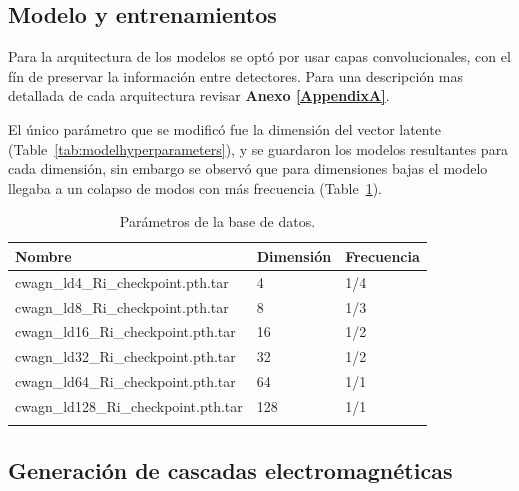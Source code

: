 \subsection*{Modelo y entrenamientos}

Para la arquitectura de los modelos se optó por usar capas convolucionales, con el fín de preservar la información entre detectores. Para una descripción mas detallada de cada arquitectura revisar \textbf{Anexo \ref{AppendixA}}.

El único parámetro que se modificó fue la dimensión del vector latente (Table~\ref{tab:modelhyperparameters}), y se guardaron los modelos resultantes para cada dimensión, sin embargo se observó que para dimensiones bajas el modelo llegaba a un colapso de modos con más frecuencia (Table~\ref{tab:latentDimTrains}).

\begin{table}
    \caption{Parámetros de la base de datos.}
    \label{tab:latentDimTrains}
    \centering
    \begin{tabular}{l l l}
        \toprule
        \textbf{Nombre} & \textbf{Dimensión} & \textbf{Frecuencia} \\
        \midrule
        cwagn\_ld4\_Ri\_checkpoint.pth.tar     & 4    & 1/4\\
        cwagn\_ld8\_Ri\_checkpoint.pth.tar     & 8    & 1/3\\
        cwagn\_ld16\_Ri\_checkpoint.pth.tar    & 16   & 1/2\\
        cwagn\_ld32\_Ri\_checkpoint.pth.tar    & 32   & 1/2\\
        cwagn\_ld64\_Ri\_checkpoint.pth.tar    & 64   & 1/1\\
        cwagn\_ld128\_Ri\_checkpoint.pth.tar   & 128  & 1/1\\
        \bottomrule\\
    \end{tabular}
\end{table}

\subsection*{Generación de cascadas electromagnéticas}


